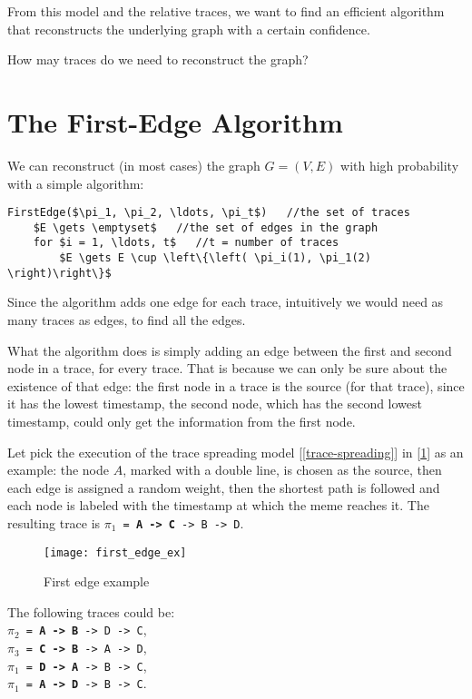 From this model and the relative traces, we want to find an efficient algorithm that reconstructs the underlying graph with a certain confidence.

\begin{qst}
    How may traces do we need to reconstruct the graph?
\end{qst}

\section{The First-Edge Algorithm}
We can reconstruct (in most cases) the graph $G=(V, E)$ with high probability with a simple algorithm:
 
\begin{lstlisting}[caption={The first-edge algorithm},label={lst:first-edge}]
FirstEdge($\pi_1, \pi_2, \ldots, \pi_t$)   //the set of traces
	$E \gets \emptyset$   //the set of edges in the graph
	for $i = 1, \ldots, t$   //t = number of traces
		$E \gets E \cup \left\{\left( \pi_i(1), \pi_1(2) \right)\right\}$
\end{lstlisting}

Since the algorithm adds one edge for each trace, intuitively we would need as many traces as edges, to find all the edges.

What the algorithm does is simply adding an edge between the first and second node in a trace, for every trace. That is because we can only be sure about the existence of that edge: the first node in a trace is the source (for that trace), since it has the lowest timestamp, the second node, which has the second lowest timestamp, could only get the information from the first node.

\begin{ex}
    Let pick the execution of the trace spreading model [\ref{trace-spreading}] in [\ref{fig:first-edge-ex}] as an example: the node $A$, marked with a double line, is chosen as the source, then each edge is assigned a random weight, then the shortest path is followed and each node is labeled with the timestamp at which the meme reaches it. The resulting trace is \texttt{$\pi_1$ = \textbf{A -> C} -> B -> D}.
    \begin{figure}[h!]
        \centering
        \texttt{[image: first\_edge\_ex]}
        \caption{First edge example}
        \label{fig:first-edge-ex}
    \end{figure}

    The following traces could be:\\
    \texttt{$\pi_2$ = \textbf{A -> B} -> D -> C},\\
    \texttt{$\pi_3$ = \textbf{C -> B} -> A -> D},\\
    \texttt{$\pi_1$ = \textbf{D -> A} -> B -> C},\\
    \texttt{$\pi_1$ = \textbf{A -> D} -> B -> C}.
\end{ex}

